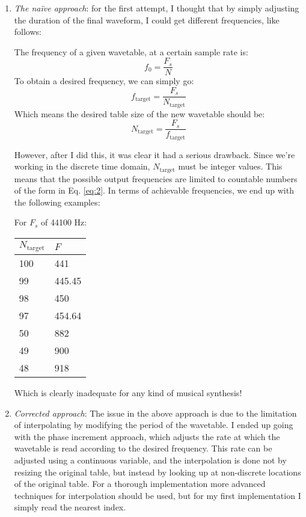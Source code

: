 \documentclass[12pt]{article}
\begin{document}
\begin{enumerate}
\item {\textit{The naïve approach}: for the first attempt, I thought that by simply adjusting the duration of the final waveform, I could get different frequencies, like follows:

The frequency of a given wavetable, at a certain sample rate is:
\begin{equation}
f_0 = \frac{F_s}{N}
\end{equation}
To obtain a desired frequency, we can simply go:
\begin{equation}\label{eq:2}
f_{\text{target}} = \frac{F_s}{N_{\text{target}}}
\end{equation}
Which means the desired table size of the new wavetable should be:
\begin{equation}
N_{\text{target}} = \frac{F_s}{f_{\text{target}}}
\end{equation}

However, after I did this, it was clear it had a serious drawback. Since we're working in the discrete time domain, $N_{\text{target}}$ must be integer values. This means that the possible output frequencies are limited to countable numbers of the form in Eq. \ref{eq:2}. In terms of achievable frequencies, we end up with the following examples:

For $F_s$ of 44100 Hz:
\begin{table}[H]\centering
\begin{tabular}{ll}
\hline
$N_{\text{target}}$	& $F$ \\
\hline
100 & 441\\
99	& 445.45\\
98	& 450\\
97	& 454.64\\
50	& 882\\
49	& 900\\
48	& 918\\
\hline
\end{tabular}
\end{table}

Which is clearly inadequate for any kind of musical synthesis!}


\item {\textit{Corrected approach}: The issue in the above approach is due to the limitation of interpolating by modifying the period of the wavetable. I ended up going with the phase increment approach, which adjusts the rate at which the wavetable is read according to the desired frequency. This rate can be adjusted using a continuous variable, and the interpolation is done not by resizing the original table, but instead by looking up at non-discrete locations of the original table. For a thorough implementation more advanced techniques for interpolation should be used, but for my first implementation I simply read the nearest index.}

\end{enumerate}
\end{document}
